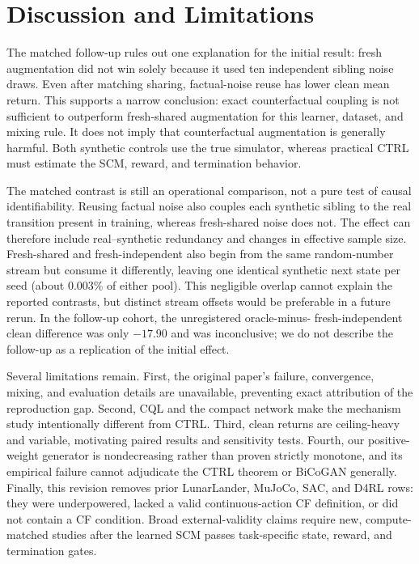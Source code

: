 \documentclass[runningheads]{llncs}
\begin{document}
\section{Discussion and Limitations}

The matched follow-up rules out one explanation for the initial result: fresh
augmentation did not win solely because it used ten independent sibling noise
draws. Even after matching sharing, factual-noise reuse has lower clean mean
return. This supports a narrow conclusion: exact counterfactual coupling is not
sufficient to outperform fresh-shared augmentation for this learner, dataset,
and mixing rule. It does
not imply that counterfactual augmentation is generally harmful. Both synthetic
controls use the true simulator, whereas practical CTRL must estimate the SCM,
reward, and termination behavior.

The matched contrast is still an operational comparison, not a pure test of
causal identifiability. Reusing factual noise also couples each synthetic sibling
to the real transition present in training, whereas fresh-shared noise does not.
The effect can therefore include real--synthetic redundancy and changes in
effective sample size. Fresh-shared and fresh-independent also begin from the
same random-number stream but consume it differently, leaving one identical
synthetic next state per seed (about 0.003\% of either pool). This negligible
overlap cannot explain the reported contrasts, but distinct stream offsets
would be preferable in a future rerun. In the follow-up cohort, the unregistered oracle-minus-
fresh-independent clean difference was only $-17.90$ and was inconclusive; we do
not describe the follow-up as a replication of the initial effect.

Several limitations remain. First, the original paper's failure, convergence,
mixing, and evaluation details are unavailable, preventing exact attribution of
the reproduction gap. Second, CQL and the compact network make the mechanism
study intentionally different from CTRL. Third, clean returns are ceiling-heavy
and variable, motivating paired results and sensitivity tests. Fourth, our
positive-weight generator is nondecreasing rather than proven strictly
monotone, and its empirical failure cannot adjudicate the CTRL theorem or
BiCoGAN generally. Finally, this revision removes prior LunarLander, MuJoCo,
SAC, and D4RL rows: they were underpowered, lacked a valid continuous-action CF
definition, or did not contain a CF condition. Broad external-validity claims
require new, compute-matched studies after the learned SCM passes task-specific
state, reward, and termination gates.
\end{document}
